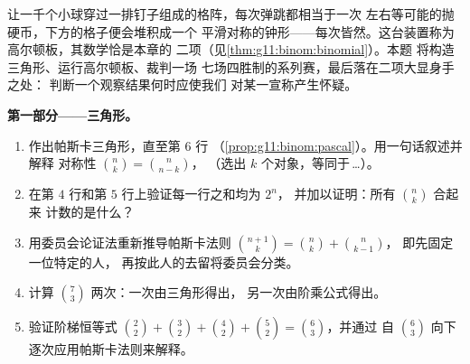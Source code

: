 \begin{problem}
\label{pb:g11:binom:1}
让一千个小球穿过一排钉子组成的格阵，每次弹跳都相当于一次
左右等可能的抛硬币，下方的格子便会堆积成一个
平滑对称的钟形——每次皆然。这台装置称为
高尔顿板，其数学恰是本章的
二项（见\cref{thm:g11:binom:binomial}）。本题
将构造三角形、运行高尔顿板、裁判一场
七场四胜制的系列赛，最后落在二项大显身手之处：
判断一个观察结果何时应使我们
对某一宣称产生怀疑。

\medskip
\noindent\textbf{第一部分——三角形。}
\begin{enumerate}
  \item 作出帕斯卡三角形，直至第 $6$ 行
        （\cref{prop:g11:binom:pascal}）。用一句话叙述并解释
        对称性 $\binom nk = \binom{n}{n-k}$，
        （选出 $k$ 个对象，等同于\,\dots）。
  \item 在第 $4$ 行和第 $5$ 行上验证每一行之和均为 $2^n$，
        并加以证明：所有 $\binom nk$ 合起来
        计数的是什么？
  \item 用委员会论证法重新推导帕斯卡法则
        $\binom{n+1}{k} = \binom nk + \binom{n}{k-1}$，
        即先固定一位特定的人，
        再按此人的去留将委员会分类。
  \item 计算 $\binom73$ 两次：一次由三角形得出，
        另一次由阶乘公式得出。
  \item 验证阶梯恒等式
        $\binom22 + \binom32 + \binom42 + \binom52 =
        \binom63$，并通过
        自 $\binom63$ 向下逐次应用帕斯卡法则来解释。
\end{enumerate}


\end{problem}
